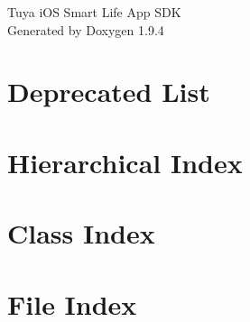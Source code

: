 \documentclass[twoside]{book}
\newcommand{\+}{\discretionary{\mbox{\scriptsize$\hookleftarrow$}}{}{}}
\newcommand{\clearemptydoublepage}{%
    \newpage{\pagestyle{empty}\cleardoublepage}%
  }
\begin{document}
  \raggedbottom
    \hypersetup{pageanchor=false,
                bookmarksnumbered=true,
                pdfencoding=unicode
               }
  \begin{titlepage}
  \vspace*{7cm}
  \begin{center}%
  {\Large Tuya i\+OS Smart Life App SDK}\\
  \vspace*{1cm}
  {\large Generated by Doxygen 1.9.4}\\
  \end{center}
  \end{titlepage}
  \clearemptydoublepage
  \tableofcontents
  \clearemptydoublepage
  \hypersetup{pageanchor=true}
\chapter{Deprecated List}
\label{deprecated}

\chapter{Hierarchical Index}

\chapter{Class Index}

\chapter{File Index}

\end{document}
